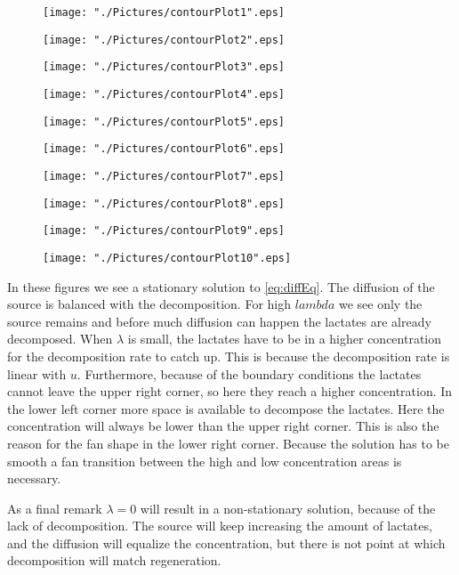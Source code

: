 \documentclass[10pt,a4paper]{article}
\begin{document}
\begin{figure}[H]
	\centering
	\texttt{[image: "./Pictures/contourPlot1".eps]}
\end{figure}
\begin{figure}[H]
	\centering
	\texttt{[image: "./Pictures/contourPlot2".eps]}
\end{figure}
\begin{figure}[H]
	\centering
	\texttt{[image: "./Pictures/contourPlot3".eps]}
\end{figure}
\begin{figure}[H]
	\centering
	\texttt{[image: "./Pictures/contourPlot4".eps]}
\end{figure}
\begin{figure}[H]
	\centering
	\texttt{[image: "./Pictures/contourPlot5".eps]}
\end{figure}
\begin{figure}[H]
	\centering
	\texttt{[image: "./Pictures/contourPlot6".eps]}
\end{figure}
\begin{figure}[H]
	\centering
	\texttt{[image: "./Pictures/contourPlot7".eps]}
\end{figure}
\begin{figure}[H]
	\centering
	\texttt{[image: "./Pictures/contourPlot8".eps]}
\end{figure}
\begin{figure}[H]
	\centering
	\texttt{[image: "./Pictures/contourPlot9".eps]}
\end{figure}
\begin{figure}[H]
	\centering
	\texttt{[image: "./Pictures/contourPlot10".eps]}
\end{figure}

In these figures we see a stationary solution to \cref{eq:diffEq}. 
The diffusion of the source is balanced with the decomposition. 
For high $lambda$ we see only the source remains and before much diffusion can happen the lactates are already decomposed. 
When $\lambda$ is small, the lactates have to be in a higher concentration for the decomposition rate to catch up. 
This is because the decomposition rate is linear with $u$. 
Furthermore, because of the boundary conditions the lactates cannot leave the upper right corner, so here they reach a higher concentration. 
In the lower left corner more space is available to decompose the lactates. 
Here the concentration will always be lower than the upper right corner.
This is also the reason for the fan shape in the lower right corner.
Because the solution has to be smooth a fan transition between the high and low concentration areas is necessary.

As a final remark $\lambda=0$ will result in a non-stationary solution, because of the lack of decomposition. The source will keep increasing the amount of lactates, and the diffusion will equalize the concentration, but there is not point at which decomposition will match regeneration. 
\end{document}
